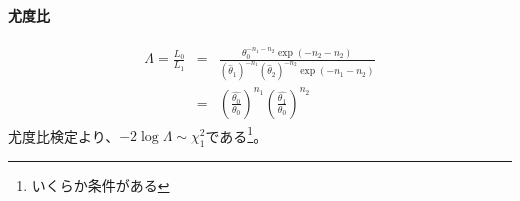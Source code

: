 \paragraph{尤度比}
\begin{eqnarray}
    \varLambda = \frac{L_{0}}{L_{1}} &=& \frac{ \theta_0^{-n_1-n_2}\exp(-n_2-n_2) }{ (\hat{\theta}_1)^{-n_1}(\hat{\theta}_2)^{-n_2} \exp(-n_1-n_2)}\\
    &=& \left(\frac{\hat{\theta_0}}{\theta_0}\right)^{n_1} \left(\frac{\hat{\theta_1}}{\theta_0} \right)^{n_2}
\end{eqnarray}
尤度比検定より、$-2\log \varLambda \sim\chi^2_1$である\footnote{いくらか条件がある}。

